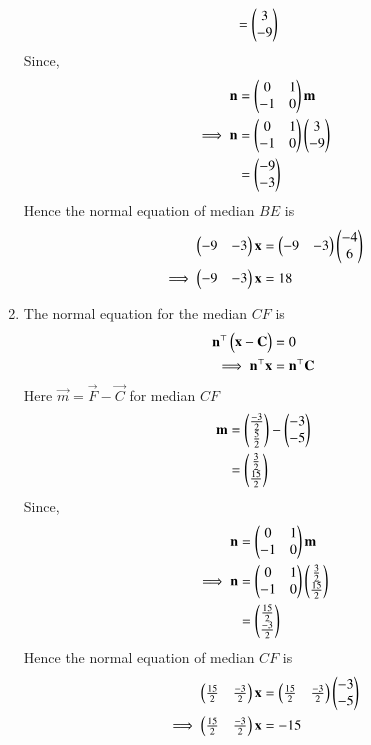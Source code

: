 \documentclass[journal,12pt,onecolumn]{IEEEtran}
\theoremstyle{remark}
\begin{document}
\begin{enumerate}
\begin{align}
       &=\begin{pmatrix}3\\-9\end{pmatrix}
\end{align}
Since,
\begin{align}
  \mathbf{n} &= \begin{pmatrix}0 & 1\\
  -1 & 0\end{pmatrix}\mathbf{m}\\
\implies
\mathbf{n} &= \begin{pmatrix}0 & 1\\
  -1 & 0\end{pmatrix}\begin{pmatrix}3\\-9\end{pmatrix}\\
        &= \begin{pmatrix}-9\\-3\end{pmatrix}
\end{align}
Hence the normal equation of median $BE$ is 
\begin{align}
    \begin{pmatrix}-9 & -3\end{pmatrix}\mathbf{x}&=\begin{pmatrix}-9 & -3\end{pmatrix}\begin{pmatrix}-4\\6\end{pmatrix}\\
\implies
    \begin{pmatrix}-9 & -3\end{pmatrix}\mathbf{x}&=18
\end{align}
\item The normal equation for the median $CF$ is
\begin{align}
\mathbf{n}^{\top}\begin{pmatrix}\mathbf{x}-\mathbf{C}\end{pmatrix}&=0\\
\implies
\mathbf{n}^{\top}\mathbf{x}&=\mathbf{n}^{\top}\mathbf{C}
\end{align}
Here $\vec{m} = \vec{F}- \vec{C}$ for median $CF$
\begin{align}
\mathbf{m}&=\begin{pmatrix}\frac{-3}{2}\\\frac{5}{2}\end{pmatrix} - \begin{pmatrix}-3\\-5\end{pmatrix}\\
       &=\begin{pmatrix}\frac{3}{2}\\\frac{15}{2}\end{pmatrix}
\end{align}
Since,
\begin{align}
  \mathbf{n} &= \begin{pmatrix}0 & 1\\
  -1 & 0\end{pmatrix}\mathbf{m}\\
\implies
\mathbf{n} &= \begin{pmatrix}0 & 1\\
  -1 & 0\end{pmatrix}\begin{pmatrix}\frac{3}{2}\\\frac{15}{2}\end{pmatrix}\\
        &= \begin{pmatrix}\frac{15}{2}\\\frac{-3}{2}\end{pmatrix}
\end{align}
Hence the normal equation of median $CF$ is 
\begin{align}
    \begin{pmatrix}\frac{15}{2} & \frac{-3}{2}\end{pmatrix}\mathbf{x}&=\begin{pmatrix}\frac{15}{2} & \frac{-3}{2}\end{pmatrix}\begin{pmatrix}-3\\-5\end{pmatrix}\\
\implies
    \begin{pmatrix}\frac{15}{2} & \frac{-3}{2}\end{pmatrix}\mathbf{x}&=-15
\end{align}
\end{enumerate}
\end{document}
